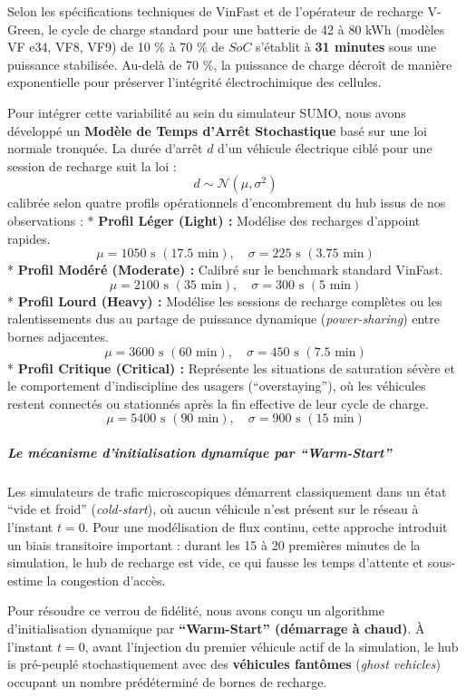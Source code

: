 \documentclass[10pt, a4paper]{article}
\begin{document}
Selon les spécifications techniques de VinFast et de l'opérateur de
recharge V-Green, le cycle de charge standard pour une batterie de 42 à
80 kWh (modèles VF e34, VF8, VF9) de 10 \% à 70 \% de \(SoC\) s'établit
à \textbf{31 minutes} sous une puissance stabilisée. Au-delà de 70 \%,
la puissance de charge décroît de manière exponentielle pour préserver
l'intégrité électrochimique des cellules.

Pour intégrer cette variabilité au sein du simulateur SUMO, nous avons
développé un \textbf{Modèle de Temps d'Arrêt Stochastique} basé sur une
loi normale tronquée. La durée d'arrêt \(d\) d'un véhicule électrique
ciblé pour une session de recharge suit la loi :
\[d \sim \mathcal{N}(\mu, \sigma^2)\] calibrée selon quatre profils
opérationnels d'encombrement du hub issus de nos observations : *
\textbf{Profil Léger (Light) :} Modélise des recharges d'appoint
rapides.
\[\mu = 1050 \text{ s } (17.5 \text{ min}), \quad \sigma = 225 \text{ s } (3.75 \text{ min})\]
* \textbf{Profil Modéré (Moderate) :} Calibré sur le benchmark standard
VinFast.
\[\mu = 2100 \text{ s } (35 \text{ min}), \quad \sigma = 300 \text{ s } (5 \text{ min})\]
* \textbf{Profil Lourd (Heavy) :} Modélise les sessions de recharge
complètes ou les ralentissements dus au partage de puissance dynamique
(\emph{power-sharing}) entre bornes adjacentes.
\[\mu = 3600 \text{ s } (60 \text{ min}), \quad \sigma = 450 \text{ s } (7.5 \text{ min})\]
* \textbf{Profil Critique (Critical) :} Représente les situations de
saturation sévère et le comportement d'indiscipline des usagers
(``overstaying''), où les véhicules restent connectés ou stationnés
après la fin effective de leur cycle de charge.
\[\mu = 5400 \text{ s } (90 \text{ min}), \quad \sigma = 900 \text{ s } (15 \text{ min})\]

\subparagraph{Le mécanisme d'initialisation dynamique par
``Warm-Start''}\label{le-muxe9canisme-dinitialisation-dynamique-par-warm-start}

Les simulateurs de trafic microscopiques démarrent classiquement dans un
état ``vide et froid'' (\emph{cold-start}), où aucun véhicule n'est
présent sur le réseau à l'instant \(t = 0\). Pour une modélisation de
flux continu, cette approche introduit un biais transitoire important :
durant les 15 à 20 premières minutes de la simulation, le hub de
recharge est vide, ce qui fausse les temps d'attente et sous-estime la
congestion d'accès.

Pour résoudre ce verrou de fidélité, nous avons conçu un algorithme
d'initialisation dynamique par \textbf{``Warm-Start'' (démarrage à
chaud)}. À l'instant \(t=0\), avant l'injection du premier véhicule
actif de la simulation, le hub is pré-peuplé stochastiquement avec des
\textbf{véhicules fantômes} (\emph{ghost vehicles}) occupant un nombre
prédéterminé de bornes de recharge.
\end{document}

